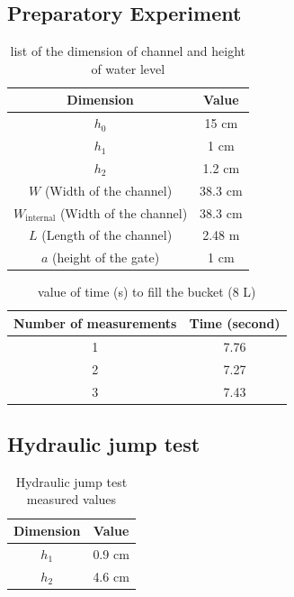 \documentclass[a4paper]{report}
\begin{document}
\subsection{Preparatory Experiment}
\begin{table}[H]
    \centering
    \begin{tabular}{|c|c|}\hline
        Dimension & Value \\\hline
        $h_0$ & 15 cm \\\hline
        $h_1$ & 1 cm \\\hline
        $h_2$ & 1.2 cm \\\hline
        $W$ (Width of the channel) & 38.3 cm \\\hline
        $W_\text{internal}$ (Width of the channel) & 38.3 cm \\\hline
        $L$ (Length of the channel) & 2.48 m \\\hline
        $a$ (height of the gate) & 1 cm \\\hline
    \end{tabular}
    \caption{list of the dimension of channel and height of water level}
    \label{tb:prep_list}
\end{table}

\begin{table}[H]
    \centering
    \begin{tabular}{|c|c|}\hline
        Number of measurements & Time (second) \\\hline
        1 & 7.76 \\\hline
        2 & 7.27 \\\hline
        3 & 7.43 \\\hline
    \end{tabular}
    \caption{value of time (s) to fill the bucket (8 L)}
    \label{tb:prep_time}
\end{table}

\subsection{Hydraulic jump test}
\begin{table}[H]
    \centering
    \begin{tabular}{|c|c|}\hline
        Dimension & Value \\\hline
        $h_1$ & 0.9 cm \\\hline
        $h_2$ & 4.6 cm \\\hline
    \end{tabular}
    \caption{Hydraulic jump test measured values}
    \label{tb:jump}
\end{table}
\end{document}
